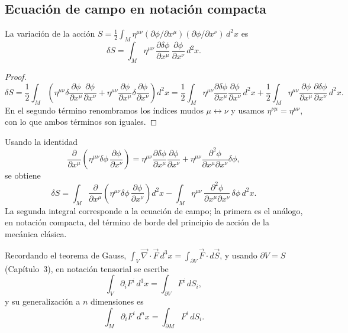 \subsection{Ecuación de campo en notación compacta}

\begin{proposicionc}
La variación de la acción $S=\tfrac12\int_M \eta^{\mu\nu}
(\partial\phi/\partial x^\mu)(\partial\phi/\partial x^\nu)\, d^2x$ es
\[
\delta S = \int_M \eta^{\mu\nu}\, \frac{\partial\delta\phi}{\partial
x^\mu}\, \frac{\partial\phi}{\partial x^\nu}\, d^2x .
\]
\end{proposicionc}

\begin{proof}
\[
\delta S = \frac12\int_M \left(\eta^{\mu\nu}\delta\frac{\partial\phi}
{\partial x^\mu}\frac{\partial\phi}{\partial x^\nu} + \eta^{\mu\nu}
\frac{\partial\phi}{\partial x^\mu}\delta\frac{\partial\phi}{\partial
x^\nu}\right) d^2x = \frac12\int_M \eta^{\mu\nu}\frac{\partial\delta
\phi}{\partial x^\mu}\frac{\partial\phi}{\partial x^\nu}\, d^2x +
\frac12\int_M \eta^{\mu\nu}\frac{\partial\phi}{\partial x^\mu}
\frac{\partial\delta\phi}{\partial x^\nu}\, d^2x .
\]
En el segundo término renombramos los índices mudos $\mu\leftrightarrow
\nu$ y usamos $\eta^{\nu\mu}=\eta^{\mu\nu}$, con lo que ambos términos
son iguales. \qedhere
\end{proof}

Usando la identidad
\[
\frac{\partial}{\partial x^\mu}\left(\eta^{\mu\nu}\delta\phi\,
\frac{\partial\phi}{\partial x^\nu}\right) = \eta^{\mu\nu}\frac{
\partial\delta\phi}{\partial x^\mu}\frac{\partial\phi}{\partial x^\nu}
+ \eta^{\mu\nu}\frac{\partial^2\phi}{\partial x^\mu\partial x^\nu}
\delta\phi,
\]
se obtiene
\[
\delta S = \int_M \frac{\partial}{\partial x^\mu}\left(\eta^{\mu\nu}
\delta\phi\, \frac{\partial\phi}{\partial x^\nu}\right) d^2x - \int_M
\eta^{\mu\nu}\, \frac{\partial^2\phi}{\partial x^\mu\partial x^\nu}\,
\delta\phi\, d^2x .
\]
La segunda integral corresponde a la ecuación de campo; la primera es el
análogo, en notación compacta, del término de borde del principio de
acción de la mecánica clásica.

\begin{proposicionc}
Recordando el teorema de Gauss, $\int_V \vec\nabla\cdot\vec F\, d^3x =
\int_{\partial V} \vec F\cdot d\vec S$, y usando $\partial V=S$
(Capítulo~3), en notación tensorial se escribe
\[
\int_V \partial_i F^i\, d^3x = \int_{\partial V} F^i\, dS_i,
\]
y su generalización a $n$ dimensiones es
\[
\int_M \partial_i F^i\, d^nx = \int_{\partial M} F^i\, dS_i .
\]
\end{proposicionc}

